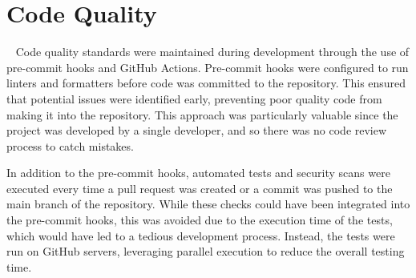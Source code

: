 \section{Code Quality}~\label{sec:code-quality}
Code quality standards were maintained during development through the use of pre-commit hooks and GitHub Actions. Pre-commit hooks were configured to run linters and formatters before code was committed to the repository. This ensured that potential issues were identified early, preventing poor quality code from making it into the repository. This approach was particularly valuable since the project was developed by a single developer, and so there was no code review process to catch mistakes.

In addition to the pre-commit hooks, automated tests and security scans were executed every time a pull request was created or a commit was pushed to the main branch of the repository. While these checks could have been integrated into the pre-commit hooks, this was avoided due to the execution time of the tests, which would have led to a tedious development process. Instead, the tests were run on GitHub servers, leveraging parallel execution to reduce the overall testing time.
